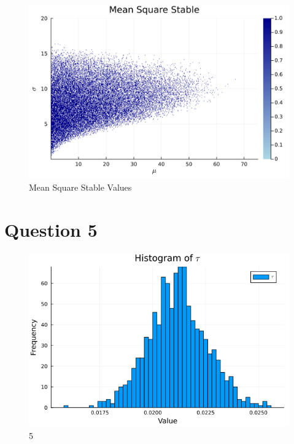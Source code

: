 \documentclass{article}
\begin{document}
\begin{figure}[H]
    \centering
    \includegraphics[scale=0.05]{imgs/4mean_square_stable.png}
    \caption{Mean Square Stable Values}
    \label{fig:meansq}
\end{figure}



\section*{Question 5}

\begin{figure}[H]
    \centering
    \includegraphics[scale=0.6]{imgs/5.png}
    \caption{5}
    \label{fig:5}
\end{figure}
\end{document}

